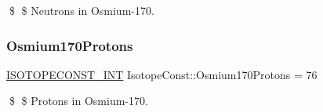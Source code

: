 \$ \$ Neutrons in Osmium-\/170. \mbox{\label{group___isotope_const-_osmium-_os170_ga8f9f10af89855d2254570f7b58253131}} 
\subsubsection{\texorpdfstring{Osmium170\+Protons}{Osmium170Protons}}
{\footnotesize\ttfamily \mbox{\hyperlink{group___isotope_const-_macros_ga5f18360b3e99483a35c32d789e62621c}{I\+S\+O\+T\+O\+P\+E\+C\+O\+N\+S\+T\+\_\+\+I\+NT}} Isotope\+Const\+::\+Osmium170\+Protons = 76}

\$ \$ Protons in Osmium-\/170. 